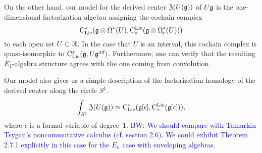 \documentclass[11pt]{amsart}
\numberwithin{equation}{section}
\def\brian{\textcolor{blue}{BW: }\textcolor{blue}}
\begin{document}
On the other hand, our model for the derived center ${\frak Z}(U(\mathfrak g))$ of $U \mathfrak g$ is the one-dimensional factorization algebra assigning the cochain complex
\[
{\rm C}_{\rm Lie}^*(\mathfrak g \otimes \Omega^*(U), {\rm C}^{\rm Lie}_*( \mathfrak g \otimes \Omega^*_c(U)))
\]
to each open set $U \subset \mathbb R$.
In the case that $U$ is an interval, this cochain complex is quasi-isomorphic to ${\rm C}_{\rm Lie}^* (\mathfrak g , U\mathfrak g^{ad})$.
Furthermore, one can verify that the resulting $E_1$-algebra structure agrees with the one coming from convolution. 

Our model also gives us a simple description of the factorization homology of the derived center along the circle $S^1$.
\[
\int_{S^1} {\frak Z}(U(\mathfrak g)) \simeq {\rm C}_{\rm Lie}^*(\mathfrak g[\epsilon], {\rm C}^{\rm Lie}_*( \mathfrak g[\epsilon])),
\]
where $\epsilon$ is a formal variable of degree~$1$. 
\brian{We should compare with Tamarkin-Tsygan's noncommutative calculus (cf. section 2.6).
We could exhibit Theorem 2.7.1 explicitly in this case for the $E_n$ case with enveloping algebras.}

  


%  
\end{document}
